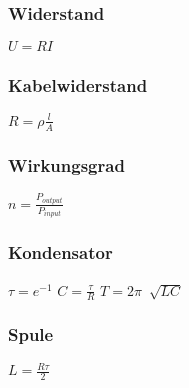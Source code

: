 \documentclass[a4paper]{article}
\begin{document}
\subsubsection*{Widerstand}
\(
U=RI
\)
\subsubsection*{Kabelwiderstand}
\(
R= \rho \frac{l}{A} 
\)
\subsubsection*{Wirkungsgrad}
\(
		n = \frac{P_{output}}{P_{input}} 
\)
\subsubsection*{Kondensator}
\(
		\tau = e^{-1}
\)
\newline
\(
C= \frac{\tau}{R} 
\)
\newline 
\(
T = 2\pi \ \sqrt[]{LC}
\)
\subsubsection*{Spule}
\(
L= \frac{R \tau}{2} 
\)
\end{document}
